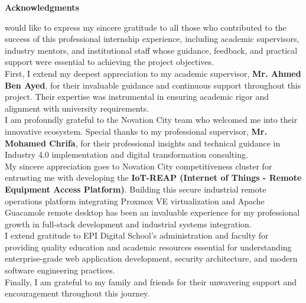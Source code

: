 
\thispagestyle{plain}
{\huge\bfseries Acknowledgments}

\vspace{1cm}

 would like to express my sincere gratitude to all those who contributed to the success of this professional internship experience, including academic supervisors, industry mentors, and institutional staff whose guidance, feedback, and practical support were essential to achieving the project objectives.\\

First, I extend my deepest appreciation to my academic supervisor, \textbf{Mr. Ahmed Ben Ayed}, for their invaluable guidance and continuous support throughout this project. Their expertise was instrumental in ensuring academic rigor and alignment with university requirements.\\

I am profoundly grateful to the Novation City team who welcomed me into their innovative ecosystem. Special thanks to my professional supervisor, \textbf{Mr. Mohamed Chrifa}, for their professional insights and technical guidance in Industry 4.0 implementation and digital transformation consulting.\\

My sincere appreciation goes to Novation City competitiveness cluster for entrusting me with developing the \textbf{IoT-REAP (Internet of Things - Remote Equipment Access Platform)}. Building this secure industrial remote operations platform integrating Proxmox VE virtualization and Apache Guacamole remote desktop has been an invaluable experience for my professional growth in full-stack development and industrial systems integration.\\

I extend gratitude to EPI Digital School's administration and faculty for providing quality education and academic resources essential for understanding enterprise-grade web application development, security architecture, and modern software engineering practices.\\

Finally, I am grateful to my family and friends for their unwavering support and encouragement throughout this journey.

\cleardoublepage